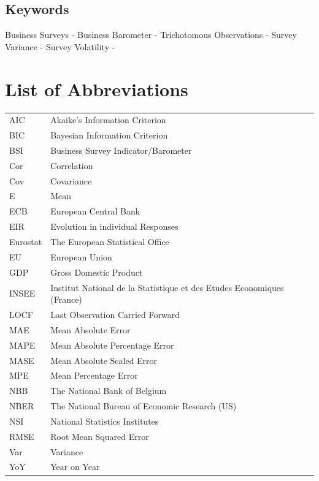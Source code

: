 \documentclass[12pt,a4paper,oneside]{book}
\begin{document}
\section*{Keywords}
Business Surveys - 
Business Barometer -
Trichotomous Observations -
Survey Variance - 
Survey Volatility -


\chapter*{List of Abbreviations}

\begin{tabular}{l l}
  AIC       & Akaike's Information Criterion \\
  BIC		& Bayesian Information Criterion \\
  BSI       & Business Survey Indicator/Barometer \\
  Cor       & Correlation \\
  Cov       & Covariance \\
  E         & Mean \\
  ECB       & European Central Bank \\
  EIR       & Evolution in individual Responses \\
  Eurostat  & The European Statistical Office \\
  EU		& European Union \\
  GDP       & Gross Domestic Product \\
  INSEE     & Institut National de la Statistique et des Etudes Economiques (France) \\
  LOCF 		& Last Observation Carried Forward \\
  MAE 		& Mean Absolute Error \\
  MAPE		& Mean Absolute Percentage Error \\
  MASE 		& Mean Absolute Scaled Error \\
  MPE 		& Mean Percentage Error \\
  NBB       & The National Bank of Belgium \\
  NBER      & The National Bureau of Economic Research (US) \\
  NSI       & National Statistics Institutes \\
  RMSE 		& Root Mean Squared Error \\
  Var       & Variance \\
  YoY       & Year on Year \\
\end{tabular}
\end{document}
